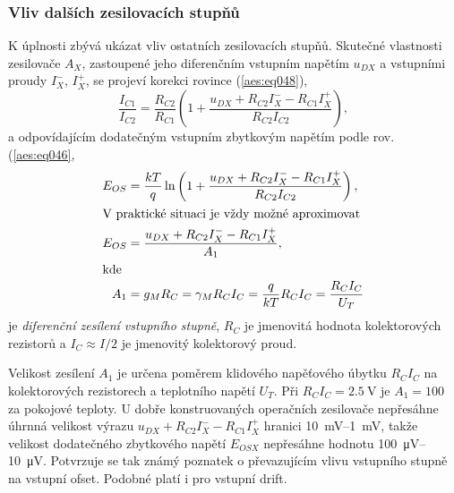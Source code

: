       \subsubsection{Vliv dalších zesilovacích stupňů}\label{aesIchIIIsecIIIssecVIII}
        K úplnosti zbývá ukázat vliv ostatních zesilovacích stupňů. Skutečné vlastnosti zesilovače
        \(A_X\), zastoupené jeho diferenčním vstupním napětím \(u_{DX}\) a vstupními proudy
        \(I_X^-\), \(I_X^+\), se projeví korekci rovince (\ref{aes:eq048}),
        \begin{equation*}
          \dfrac{I_{C1}}{I_{C2}} = \dfrac{R_{C2}}{R_{C1}}
          \left(1 + \dfrac{u_{DX} + R_{C2}I_X^- - R_{C1}I_X^+}{R_{C2}I_{C2}}\right),
        \end{equation*}
        a odpovídajícím dodatečným vstupním zbytkovým napětím podle rov. (\ref{aes:eq046},
        \begin{subequations}\label{aes:eq063}
          \begin{align}
            E_{OS} &= \dfrac{kT}{q}\ln
            \left(1 + 
              \dfrac{u_{DX} + R_{C2}I_X^- - R_{C1}I_X^+}{R_{C2}I_{C2}}
            \right),                                                         \label{aes:eq063a}  \\
            \shortintertext{V praktické situaci je vždy možné aproximovat}
            E_{OS} &= \dfrac{u_{DX} + R_{C2}I_X^- - R_{C1}I_X^+}{A_1},       \label{aes:eq063b}  \\
            \shortintertext{kde}
            A_1   &= g_MR_C = \gamma_MR_CI_C 
                   = \dfrac{q}{kT}R_CI_C = \dfrac{R_CI_C}{U_T}               \label{aes:eq063c}
          \end{align}
        \end{subequations}
        je \emph{diferenční zesílení vstupního stupně}, \(R_C\) je jmenovitá hodnota kolektorových
        rezistorů a \(I_C \approx I/2\) je jmenovitý kolektorový proud.

        Velikost zesílení \(A_1\) je určena poměrem klidového napěťového úbytku \(R_CI_C\) na
        kolektorových rezistorech a teplotního napětí \(U_T\). Při \(R_CI_C = \qty{2.5}{\V}\) je
        \(A_1 = 100\) za pokojové teploty. U dobře konstruovaných operačních zesilovače nepřesáhne
        úhrnná velikost výrazu \(u_{DX} + R_{C2}I_X^- - R_{C1}I_X^+\) hranici \SIrange{10}{1}{\mV},
        takže velikost dodatečného zbytkového napětí \(E_{OSX}\) nepřesáhne hodnotu
        \SIrange{100}{10}{\uV}. Potvrzuje se tak známý poznatek o převazujícím vlivu vstupního
        stupně na vstupní ofset. Podobné platí i pro vstupní drift.

